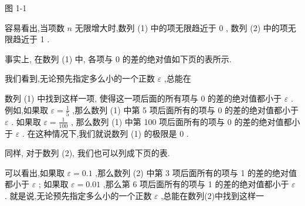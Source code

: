 \documentclass[10pt]{article}
\begin{document}
图 1-1

容易看出,当项数 \(n\) 无限增大时,数列 (1) 中的项无限趋近于 0 , 数列 (2) 中的项无限趋近于 1 .

事实上, 在数列 (1) 中, 各项与 0 的差的绝对值如下页的表所示.

我们看到,无论预先指定多么小的一个正数 \(\varepsilon\) ,总能在

\begin{center}
\end{center}

数列 (1) 中找到这样一项, 使得这一项后面的所有项与 0 的差的绝对值都小于 \(\varepsilon\) . 例如,如果取 \(\varepsilon = \frac{1}{5}\) ,那么数列 (1) 中第 5 项后面所有的项与 0 的差的绝对值都小于 \(\varepsilon\) . 如果取 \(\varepsilon = \frac{1}{100}\) , 那么数列 (1) 中第 100 项后面所有的项与 0 的差的绝对值都小于 \(\varepsilon\) . 在这种情况下,我们就说数列 (1) 的极限是 0 .

同样, 对于数列 (2), 我们也可以列成下页的表.

可以看出,如果取 \(\varepsilon = {0.1}\) ,那么数列 (2) 中第 3 项后面所有的项与 1 的差的绝对值都小于 \(\varepsilon\) ; 如果取 \(\varepsilon = {0.01}\) ,那么第 6 项后面所有的项与 1 的差的绝对值都小于 \(\varepsilon\) . 就是说,无论预先指定多么小的一个正数 \(\varepsilon\) ,总能在数列(2)中找到这样一
\end{document}
